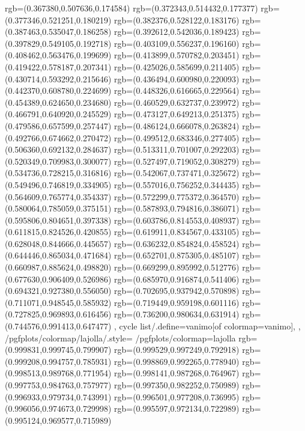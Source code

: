 {{{			rgb=(0.367380,0.507636,0.174584)
			rgb=(0.372343,0.514432,0.177377)
			rgb=(0.377346,0.521251,0.180219)
			rgb=(0.382376,0.528122,0.183176)
			rgb=(0.387463,0.535047,0.186258)
			rgb=(0.392612,0.542036,0.189423)
			rgb=(0.397829,0.549105,0.192718)
			rgb=(0.403109,0.556237,0.196160)
			rgb=(0.408462,0.563476,0.199699)
			rgb=(0.413899,0.570782,0.203451)
			rgb=(0.419422,0.578187,0.207341)
			rgb=(0.425026,0.585699,0.211405)
			rgb=(0.430714,0.593292,0.215646)
			rgb=(0.436494,0.600980,0.220093)
			rgb=(0.442370,0.608780,0.224699)
			rgb=(0.448326,0.616665,0.229564)
			rgb=(0.454389,0.624650,0.234680)
			rgb=(0.460529,0.632737,0.239972)
			rgb=(0.466791,0.640920,0.245529)
			rgb=(0.473127,0.649213,0.251375)
			rgb=(0.479586,0.657599,0.257447)
			rgb=(0.486124,0.666078,0.263824)
			rgb=(0.492766,0.674662,0.270472)
			rgb=(0.499512,0.683346,0.277405)
			rgb=(0.506360,0.692132,0.284637)
			rgb=(0.513311,0.701007,0.292203)
			rgb=(0.520349,0.709983,0.300077)
			rgb=(0.527497,0.719052,0.308279)
			rgb=(0.534736,0.728215,0.316816)
			rgb=(0.542067,0.737471,0.325672)
			rgb=(0.549496,0.746819,0.334905)
			rgb=(0.557016,0.756252,0.344435)
			rgb=(0.564609,0.765774,0.354337)
			rgb=(0.572299,0.775372,0.364570)
			rgb=(0.580064,0.785059,0.375151)
			rgb=(0.587893,0.794816,0.386071)
			rgb=(0.595806,0.804651,0.397338)
			rgb=(0.603786,0.814553,0.408937)
			rgb=(0.611815,0.824526,0.420855)
			rgb=(0.619911,0.834567,0.433105)
			rgb=(0.628048,0.844666,0.445657)
			rgb=(0.636232,0.854824,0.458524)
			rgb=(0.644446,0.865034,0.471684)
			rgb=(0.652701,0.875305,0.485107)
			rgb=(0.660987,0.885624,0.498820)
			rgb=(0.669299,0.895992,0.512776)
			rgb=(0.677630,0.906409,0.526986)
			rgb=(0.685970,0.916874,0.541406)
			rgb=(0.694321,0.927380,0.556050)
			rgb=(0.702695,0.937942,0.570898)
			rgb=(0.711071,0.948545,0.585932)
			rgb=(0.719449,0.959198,0.601116)
			rgb=(0.727825,0.969893,0.616456)
			rgb=(0.736200,0.980634,0.631914)
			rgb=(0.744576,0.991413,0.647477)
		},
	cycle list/.define={vanimo}{[of colormap=vanimo]},
	},
	/pgfplots/colormap/lajolla/.style={
		/pgfplots/colormap={lajolla}{%
			rgb=(0.999831,0.999745,0.799907)
			rgb=(0.999529,0.997249,0.792918)
			rgb=(0.999208,0.994757,0.785931)
			rgb=(0.998869,0.992265,0.778940)
			rgb=(0.998513,0.989768,0.771954)
			rgb=(0.998141,0.987268,0.764967)
			rgb=(0.997753,0.984763,0.757977)
			rgb=(0.997350,0.982252,0.750989)
			rgb=(0.996933,0.979734,0.743991)
			rgb=(0.996501,0.977208,0.736995)
			rgb=(0.996056,0.974673,0.729998)
			rgb=(0.995597,0.972134,0.722989)
			rgb=(0.995124,0.969577,0.715989)
}}}
